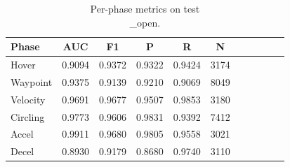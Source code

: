 \begin{table}[htbp]
\centering
\caption{Per-phase metrics on test\\_open.}
\label{tab:phase_test_open}
\begin{tabular}{lcccccccccc}
\toprule
Phase & AUC & F1 & P & R & N \\
\midrule
Hover & 0.9094 & 0.9372 & 0.9322 & 0.9424 & 3174 \\
Waypoint & 0.9375 & 0.9139 & 0.9210 & 0.9069 & 8049 \\
Velocity & 0.9691 & 0.9677 & 0.9507 & 0.9853 & 3180 \\
Circling & 0.9773 & 0.9606 & 0.9831 & 0.9392 & 7412 \\
Accel & 0.9911 & 0.9680 & 0.9805 & 0.9558 & 3021 \\
Decel & 0.8930 & 0.9179 & 0.8680 & 0.9740 & 3110 \\
\bottomrule
\end{tabular}
\end{table}
